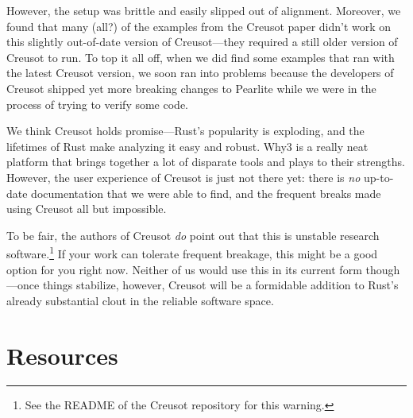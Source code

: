 \documentclass[12pt]{article}
\begin{document}
However, the setup was brittle and easily slipped out of alignment.
Moreover, we found that many (all?) of the examples from the Creusot paper didn't work on this slightly out-of-date version of Creusot---they required a still older version of Creusot to run.
To top it all off, when we did find some examples that ran with the latest Creusot version, we soon ran into problems because the developers of Creusot shipped yet more breaking changes to Pearlite while we were in the process of trying to verify some code.

We think Creusot holds promise---Rust's popularity is exploding, and the lifetimes of Rust make analyzing it easy and robust.
Why3 is a really neat platform that brings together a lot of disparate tools and plays to their strengths.
However, the user experience of Creusot is just not there yet: there is \emph{no} up-to-date documentation that we were able to find, and the frequent breaks made using Creusot all but impossible.

To be fair, the authors of Creusot \emph{do} point out that this is unstable research software.\footnote{See the README of the Creusot\cite{denisCreusot2023} repository for this warning.}
If your work can tolerate frequent breakage, this might be a good option for you right now.
Neither of us would use this in its current form though---once things stabilize, however, Creusot will be a formidable addition to Rust's already substantial clout in the reliable software space.

\section{Resources}
\end{document}
